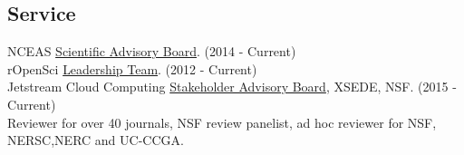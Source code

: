 \documentclass[10pt]{article} %
\begin{document}
\begin{paracol}{2}

\medskip %


\section{Service}

  NCEAS \href{https://www.nceas.ucsb.edu/content/nceas-science-advisers}{Scientific
  Advisory Board}. (2014 - Current)\\
  
  rOpenSci \href{https://ropensci.org/about/\#team}{Leadership Team}. (2012 - Current)\\
  
  Jetstream Cloud Computing
  \href{https://jetstream-cloud.org/about/advisory-board.php}{Stakeholder
  Advisory Board}, XSEDE, NSF. (2015 - Current)\\
  
  Reviewer for over 40 journals, NSF review panelist, ad hoc reviewer
  for NSF, NERSC,NERC and UC-CCGA.



\end{paracol}

\end{document}
